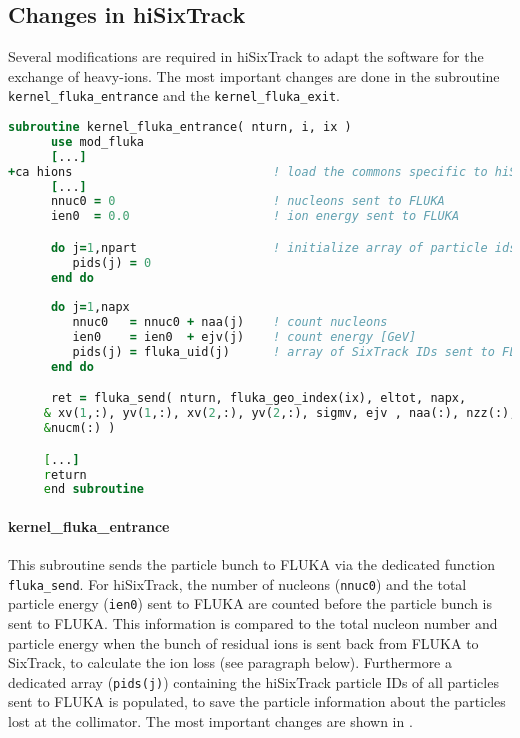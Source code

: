 \begin{appendices}
\subsection{Changes in hiSixTrack} \label{app:changeshist}
Several modifications are required in hiSixTrack to adapt the software for the exchange of heavy-ions. The most important changes are done in the subroutine \texttt{kernel\_fluka\_entrance} and the \texttt{kernel\_fluka\_exit}.

\vspace{0.5cm}
\begin{minipage}{\linewidth}
\begin{lstlisting}[language=Fortran,caption=Send particles to FLUKA as implemented in hiSixTrack.,label=lst:coupling_send]
      subroutine kernel_fluka_entrance( nturn, i, ix )
      use mod_fluka
      [...]
+ca hions                            ! load the commons specific to hiST
      [...]	
      nnuc0 = 0                      ! nucleons sent to FLUKA
      ien0  = 0.0                    ! ion energy sent to FLUKA

      do j=1,npart                   ! initialize array of particle ids 
         pids(j) = 0
      end do
	
      do j=1,napx                    
         nnuc0   = nnuc0 + naa(j)    ! count nucleons
         ien0    = ien0  + ejv(j)    ! count energy [GeV]
         pids(j) = fluka_uid(j)      ! array of SixTrack IDs sent to FLUKA
      end do

      ret = fluka_send( nturn, fluka_geo_index(ix), eltot, napx,        &
     & xv(1,:), yv(1,:), xv(2,:), yv(2,:), sigmv, ejv , naa(:), nzz(:), &
     &nucm(:) ) 

     [...]
     return
     end subroutine
\end{lstlisting}
\end{minipage}

\paragraph{kernel\_fluka\_entrance}
This subroutine sends the particle bunch to FLUKA via the dedicated function \texttt{fluka\_send}. For hiSixTrack, the number of nucleons (\texttt{nnuc0}) and the total particle energy (\texttt{ien0}) sent to FLUKA are counted before the particle bunch is sent to FLUKA. This information is compared to the total nucleon number and particle energy when the bunch of residual ions is sent back from FLUKA to SixTrack, to calculate the ion loss (see paragraph below). Furthermore a dedicated array (\texttt{pids(j)}) containing the hiSixTrack particle IDs of all particles sent to FLUKA is populated, to save the particle information about the particles lost at the collimator.  The most important changes are shown in .



\end{appendices}
